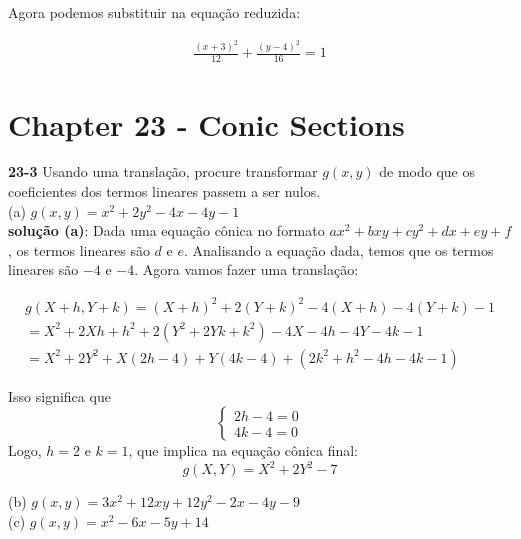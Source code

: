 Agora podemos substituir na equação reduzida:

\begin{equation}
    \begin{split}
        \frac{(x + 3)^2}{12} + \frac{(y - 4)^2}{16} = 1
    \end{split}
\end{equation}

\section{Chapter 23 - Conic Sections}

\textbf{23-3} Usando uma translação, procure transformar $g(x,y)$ de modo que os coeficientes dos
termos lineares passem a ser nulos.\\
(a) $g(x,y) = x^2 + 2y^2 - 4x - 4y -1$ \\


\textbf{solução (a)}: Dada uma equação cônica no formato $ax^2 +bxy + cy^2 + dx + ey + f$, os termos lineares são $d$ e $e$. Analisando a equação dada, temos que os termos lineares são $-4$ e  $-4$. Agora vamos fazer uma translação:

\begin{equation}
    \begin{split}
        g(X + h, Y + k) = (X + h)^2 + 2(Y + k)^2 -4(X + h) -4(Y + k) - 1 \\
        =X^2 +2Xh + h^2 + 2(Y^2 +2Yk + k^2) -4X -4h -4Y -4k -1 \\
        =X^2 + 2Y^2 +X(2h - 4) + Y(4k - 4) + (2k^2 + h^2 - 4h -4k -1)
    \end{split}
\end{equation}

Isso significa que
\begin{equation}
    \left\{
        \begin{aligned}
            2h - 4 = 0 \\
            4k - 4 = 0
        \end{aligned}
    \right.
\end{equation}
Logo, $h=2$ e $k=1$, que implica na equação cônica final:
\begin{equation}
        g(X, Y) = X^2 + 2Y^2 - 7
\end{equation}


(b) $g(x,y) = 3x^2+ 12xy + 12y^2 -2x -4y -9$ \\
(c) $g(x,y) = x^2 - 6x - 5y + 14$ \\

